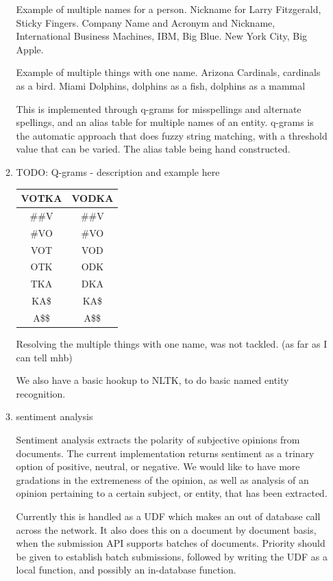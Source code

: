 \documentclass{article}
\begin{document}
\begin{enumerate}
\begin{enumerate}
    Example of multiple names for a person.
    Nickname for Larry Fitzgerald, Sticky Fingers.
    Company Name and Acronym and Nickname, International Business Machines, IBM, Big Blue.
    New York City, Big Apple.

    Example of multiple things with one name.
    Arizona Cardinals, cardinals as a bird.
    Miami Dolphins, dolphins as a fish, dolphins as a mammal


    This is implemented through q-grams for misspellings and alternate spellings,
    and an alias table for multiple names of an entity.
    q-grams is the automatic approach that does fuzzy string matching,
    with a threshold value that can be varied.
    The alias table being hand constructed.


  \item TODO: Q-grams - description and example here

    \begin{tabular}{cc}
      VOTKA & VODKA \\ \hline
      {\color{green}\#\#V} & {\color{green}\#\#V} \\
      {\color{green}\#VO} & {\color{green}\#VO} \\
      {\color{red}VOT} &  {\color{red}VOD} \\
      {\color{red} OTK} &{\color{red} ODK} \\
      {\color{red} TKA} &{\color{red} DKA} \\
      {\color{green}KA\$} & {\color{green}KA\$} \\
      {\color{green}A\$\$} &  {\color{green}A\$\$} \\
    \end{tabular}

    Resolving the multiple things with one name, was not tackled. (as far as I can tell mhb)

    We also have a basic hookup to NLTK, to do basic named entity recognition.

  \item sentiment analysis

    Sentiment analysis extracts the polarity of subjective opinions from documents.
    The current implementation returns sentiment as a trinary option of positive, neutral, or negative.
    We would like to have more gradations in the extremeness of the opinion,
    as well as analysis of an opinion pertaining to a certain subject, or entity, that has been extracted.

    Currently this is handled as a UDF which makes an out of database call across the network.
    It also does this on a document by document basis,
    when the submission API supports batches of documents.
    Priority should be given to establish batch submissions,
    followed by writing the UDF as a local function,
    and possibly an in-database function.


\end{enumerate}
\end{enumerate}
\end{document}

